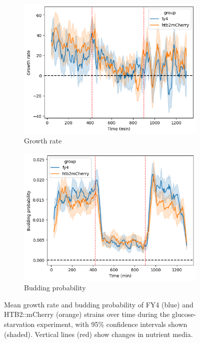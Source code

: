 \begin{figure}
  \centering
  \begin{subfigure}[htpb]{0.7\textwidth}
   \centering
   \includegraphics[width=\textwidth]{allstrains_19972_gr}
   \caption{
     Growth rate
   }
   \label{fig:biology-starvation-gr}
  \end{subfigure}

  \begin{subfigure}[htpb]{0.7\textwidth}
   \centering
   \includegraphics[width=\textwidth]{allstrains_19972_budprob}
   \caption{
     Budding probability
   }
   \label{fig:biology-starvation-budprob}
  \end{subfigure}

  \caption{
    Mean growth rate and budding probability of FY4 (blue) and HTB2::mCherry (orange) strains over time during the glucose-starvation experiment, with 95\% confidence intervals shown (shaded).
    Vertical lines (red) show changes in nutrient media.
  }
  \label{fig:biology-starvation-gr-budprob}
\end{figure}

